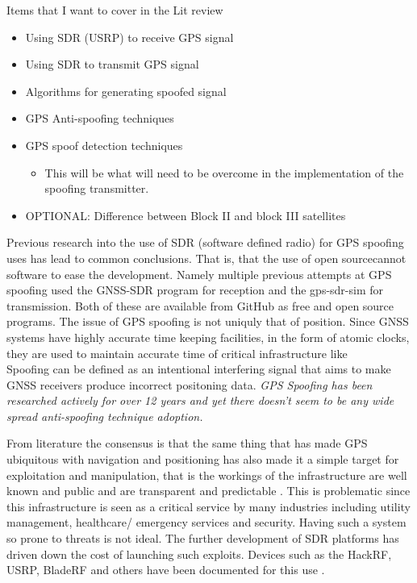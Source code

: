\bigskip
Items that I want to cover in the Lit review
\begin{itemize}
    \item Using SDR (USRP) to receive GPS signal
    \item Using SDR to transmit GPS signal
    \item Algorithms for generating spoofed signal
    \item GPS Anti-spoofing techniques
    \item GPS spoof detection techniques
    \begin{itemize}
        \item This will be what will need to be overcome in the implementation of the spoofing transmitter.
    \end{itemize}
    \item OPTIONAL: Difference between Block II and block III satellites
\end{itemize}
\medskip
Previous research into the use of SDR (software defined radio) for GPS spoofing uses has lead to common conclusions.
That is, that the use of open sourcecannot  software to ease the development. Namely multiple previous attempts at GPS spoofing
used the GNSS-SDR program for reception and the gps-sdr-sim for transmission. Both of these are available from GitHub as free
and open source programs. The issue of GPS spoofing is not uniquly that of position. Since GNSS systems have highly accurate time keeping
facilities, in the form of atomic clocks, they are used to maintain accurate time of critical infrastructure like \\

Spoofing can be defined as an intentional interfering signal that aims to make GNSS receivers produce incorrect positoning data\cite{RN8}.
\emph{GPS Spoofing has been researched actively for over 12 years and yet there doesn't seem to be any wide spread anti-spoofing technique adoption.}

\bigskip
From literature the consensus is that the same thing that has made GPS ubiquitous with navigation and 
positioning has also made it a simple target for exploitation and manipulation, that is the workings
of the infrastructure are well known and public and are transparent and predictable \cite{RN7} \cite{RN4}. This is problematic since this infrastructure
is seen as a critical service by many industries including utility management, healthcare/ emergency services and security.
Having such a system so prone to threats is not ideal. The further development of SDR platforms has driven down the cost of launching
such exploits. Devices such as the HackRF, USRP, BladeRF and others have been documented for this use \cite{RN4} \cite{RN9}.

